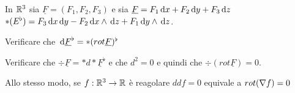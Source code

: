 \begin{exercise}
	In $\mathbb R^3$ sia $\underline F=(F_1,F_2,F_3)$ e sia $\underline F = F_1 \,\mathrm d x + F_2 \,\mathrm d y + F_3 \,\mathrm d z$
	$*(E^\flat) = F_3\,\mathrm d x \,\mathrm d y - F_2 \,\mathrm d x \wedge \,\mathrm d z + F_1 \,\mathrm d y \wedge \,\mathrm d z$.
	
	Verificare che $\,\mathrm d \underline{F}^\flat = *(rot \underline{F})^\flat$
	
	Verificare che $\div \underline F = *d * \underline F^\flat$ e che $d^2 = 0$ e quindi che $\div (rot \underline F)=0$.
	
	Allo stesso modo, se $f:\mathbb R^3\to\mathbb R$ è reagolare $ddf=0$ equivale a $rot(\nabla f)=0$
\end{exercise}
























































































